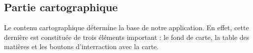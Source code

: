 \subsection{Partie cartographique}


Le contenu cartographique détermine la base de notre application. En effet, cette dernière est constituée de trois éléments important : le fond de carte, la table des matières et les boutons d'interraction avec la carte.





